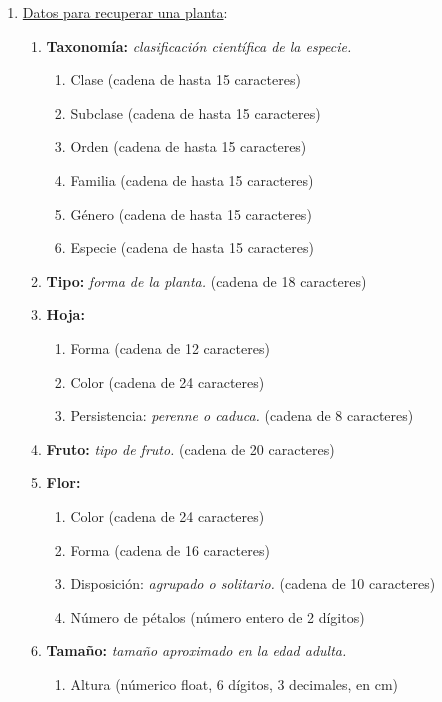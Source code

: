 \documentclass[10pt,a4paper]{article}
\begin{document}
\begin{enumerate}[label={RD\arabic*.} ,leftmargin=2.8\parindent]
	\item \underline{Datos para recuperar una planta}:
	\begin{enumerate}[label={RD5.\arabic*.}]
		\item 
		\textbf{Taxonomía:} \textit{clasificación científica de la especie.}
	\begin{enumerate}[label=-]
		\item Clase (cadena de hasta 15 caracteres)
		\item Subclase (cadena de hasta 15 caracteres)
		\item Orden (cadena de hasta 15 caracteres)
		\item Familia (cadena de hasta 15 caracteres)
		\item Género (cadena de hasta 15 caracteres)
		\item Especie (cadena de hasta 15 caracteres)
	\end{enumerate}
	\medskip
	\item 
		\textbf{Tipo:} \textit{forma de la planta.} (cadena de 18 caracteres)

	\medskip
	\item
		\textbf{Hoja:}
	\begin{enumerate}[label=-]
		\item Forma (cadena de 12 caracteres)
		\item Color (cadena de 24 caracteres)
		\item Persistencia: \textit{perenne o caduca.} (cadena de 8 caracteres)
	\end{enumerate}

	\medskip	
	\item
		\textbf{Fruto:} \textit{tipo de fruto.} (cadena de 20 caracteres)

	\medskip
	\item
		\textbf{Flor:}
	\begin{enumerate} [label=-]
		\item Color (cadena de 24 caracteres)
		\item Forma (cadena de 16 caracteres)
		\item Disposición: \textit{agrupado o solitario.} (cadena de 10 caracteres)
		\item Número de pétalos (número entero de 2 dígitos)
	\end{enumerate}

	\medskip
	\item
		\textbf{Tamaño:} \textit{tamaño aproximado en la edad adulta.}
	\begin{enumerate}[label=-]
		\item Altura (númerico float, 6 dígitos, 3 decimales, en cm)
	\end{enumerate}
	

\end{enumerate}
\end{enumerate}
\end{document}
